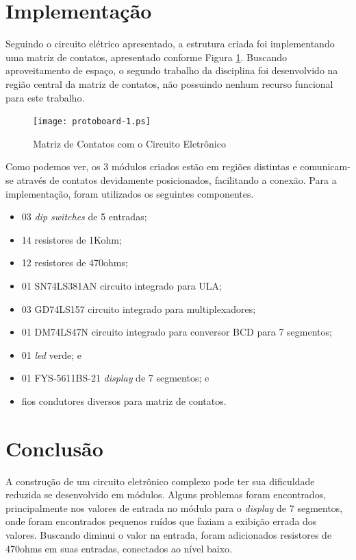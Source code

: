 \documentclass{article}
\begin{document}
\section{Implementação}

Seguindo o circuito elétrico apresentado, a estrutura criada foi implementando
uma matriz de contatos, apresentado conforme Figura \ref{fig:protoboard-1}.
Buscando aproveitamento de espaço, o segundo trabalho da disciplina foi
desenvolvido na região central da matriz de contatos, não possuindo nenhum
recurso funcional para este trabalho.

\begin{figure}
    \centering{}
    \texttt{[image: protoboard-1.ps]}
    \caption{Matriz de Contatos com o Circuito Eletrônico}
    \label{fig:protoboard-1}
\end{figure}

Como podemos ver, os 3 módulos criados estão em regiões distintas e comunicam-se
através de contatos devidamente posicionados, facilitando a conexão. Para a
implementação, foram utilizados os seguintes componentes.

\begin{itemize}
    \item 03 \emph{dip switches} de 5 entradas;
    \item 14 resistores de 1Kohm;
    \item 12 resistores de 470ohms;
    \item 01 SN74LS381AN circuito integrado para ULA;
    \item 03 GD74LS157 circuito integrado para multiplexadores;
    \item 01 DM74LS47N circuito integrado para conversor BCD para 7 segmentos;
    \item 01 \emph{led} verde; e
    \item 01 FYS-5611BS-21 \emph{display} de 7 segmentos; e
    \item fios condutores diversos para matriz de contatos.
\end{itemize}

\section{Conclusão}

A construção de um circuito eletrônico complexo pode ter sua dificuldade
reduzida se desenvolvido em módulos. Alguns problemas foram encontrados,
principalmente nos valores de entrada no módulo para o \emph{display} de 7
segmentos, onde foram encontrados pequenos ruídos que faziam a exibição errada
dos valores. Buscando diminui o valor na entrada, foram adicionados resistores
de 470ohms em suas entradas, conectados ao nível baixo.
\end{document}
